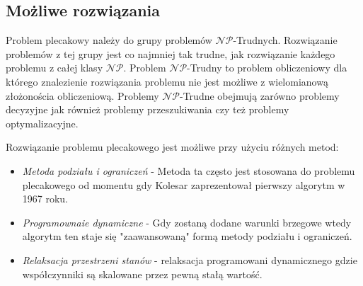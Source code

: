 \subsection{Możliwe rozwiązania}

Problem plecakowy należy do grupy problemów $\mathcal{NP}$-Trudnych. Rozwiązanie problemów z tej grupy jest co najmniej tak trudne, jak rozwiązanie każdego problemu z całej klasy $\mathcal{NP}$. Problem $\mathcal{NP}$-Trudny to problem obliczeniowy dla którego znalezienie rozwiązania problemu nie jest możliwe z wielomianową złożonościa obliczeniową. Problemy $\mathcal{NP}$-Trudne obejmują zarówno problemy decyzyjne jak również problemy przeszukiwania czy też problemy optymalizacyjne.

Rozwiązanie problemu plecakowego jest możliwe przy użyciu różnych metod:
\begin{itemize}
  \item \textit{Metoda podziału i ograniczeń} - Metoda ta często jest stosowana do problemu plecakowego od momentu gdy Kolesar \cite{KolesarArticle} zaprezentował pierwszy algorytm w 1967 roku.
  \item \textit{Programownaie dynamiczne} - Gdy zostaną dodane warunki brzegowe wtedy algorytm ten staje się "zaawansowaną" formą metody podziału i ograniczeń.
  \item \textit{Relaksacja przestrzeni stanów} - relaksacja programowani dynamicznego gdzie współczynniki są skalowane przez pewną stałą wartość.
\end{itemize}

